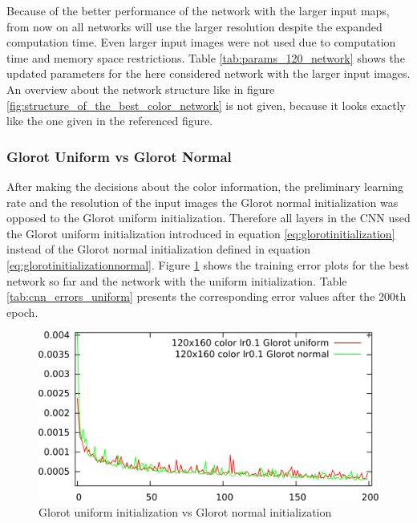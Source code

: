 \documentclass[11pt, a4paper]{article}
\begin{document}


Because of the better performance of the network with the larger input maps, from now on all networks will use the larger resolution despite the expanded computation time. Even larger input images were not used due to computation time and memory space restrictions. Table \ref{tab:params_120_network} shows the updated parameters for the here considered network with the larger input images. An overview about the network structure like in figure \ref{fig:structure_of_the_best_color_network} is not given, because it looks exactly like the one given in the referenced figure.



\subsubsection{Glorot Uniform vs Glorot Normal}

After making the decisions about the color information, the preliminary learning rate and the resolution of the input images the Glorot normal initialization was opposed to the Glorot uniform initialization. Therefore all layers in the \ac{CNN} used the Glorot uniform initialization introduced in equation \eqref{eq:glorotinitialization} instead of the Glorot normal initialization defined in equation \eqref{eq:glorotinitializationnormal}. Figure \ref{fig:cnn_normal_vs_uniform} shows the training error plots for the best network so far and the network with the uniform initialization. Table \ref{tab:cnn_errors_uniform} presents the corresponding error values after the 200th epoch.

\begin{figure}[h!]
	\centering
	\includegraphics[width=\textwidth]{results/cnn_normal_vs_uniform.png}
	\caption{Glorot uniform initialization vs Glorot normal initialization}
	\label{fig:cnn_normal_vs_uniform}
\end{figure}
\end{document}
